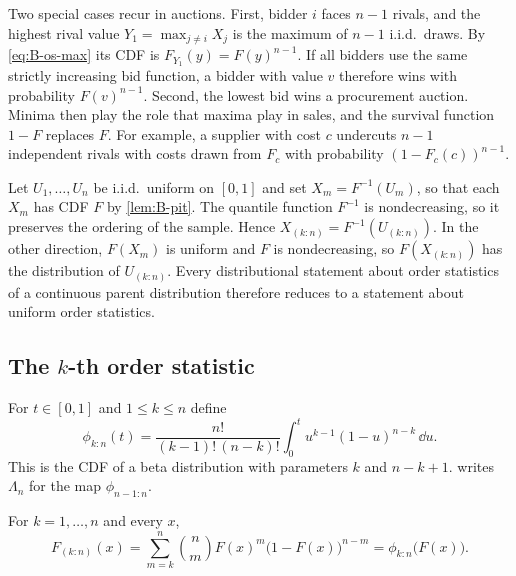 Two special cases recur in auctions. First, bidder $i$ faces $n-1$ rivals, and the highest rival value
$Y_1 = \max_{j \neq i}X_j$ is the maximum of $n-1$ i.i.d.\ draws. By \eqref{eq:B-os-max} its CDF is
$F_{Y_1}(y) = F(y)^{n-1}$. If all bidders use the same strictly increasing bid function, a bidder with value
$v$ therefore wins with probability $F(v)^{n-1}$. Second, the lowest bid wins a procurement auction. Minima
then play the role that maxima play in sales, and the survival function $1 - F$ replaces $F$. For example,
a supplier with cost $c$ undercuts $n-1$ independent rivals with costs drawn from $F_c$ with probability
$(1 - F_c(c))^{n-1}$.

\begin{remark}\label{rem:B-os-quantile}
Let $U_1, \dots, U_n$ be i.i.d.\ uniform on $[0,1]$ and set $X_m = F^{-1}(U_m)$, so that each $X_m$ has CDF $F$
by \cref{lem:B-pit}. The quantile function $F^{-1}$ is nondecreasing, so it preserves the ordering of the
sample. Hence $X_{(k:n)} = F^{-1}(U_{(k:n)})$. In the other direction, $F(X_m)$ is uniform and $F$ is
nondecreasing, so $F(X_{(k:n)})$ has the distribution of $U_{(k:n)}$. Every distributional statement about
order statistics of a continuous parent distribution therefore reduces to a statement about uniform order
statistics.
\end{remark}

\subsection{The \texorpdfstring{$k$}{k}-th order statistic}\label{sec:B-os-k}

For $t \in [0,1]$ and $1 \leq k \leq n$ define
\begin{equation}\label{eq:B-phi}
  \phi_{k:n}(t) = \frac{n!}{(k-1)!\,(n-k)!}\int_0^t u^{k-1}(1-u)^{n-k}\,\dd u.
\end{equation}
This is the CDF of a beta distribution with parameters $k$ and $n-k+1$.  writes
$\Lambda_n$ for the map $\phi_{n-1:n}$.

\begin{proposition}\label{prop:B-os-cdf}
For $k = 1, \dots, n$ and every $x$,
\begin{equation}\label{eq:B-os-cdf}
  F_{(k:n)}(x) = \sum_{m=k}^{n}\binom{n}{m}F(x)^m\big(1 - F(x)\big)^{n-m} = \phi_{k:n}\big(F(x)\big).
\end{equation}
\end{proposition}

